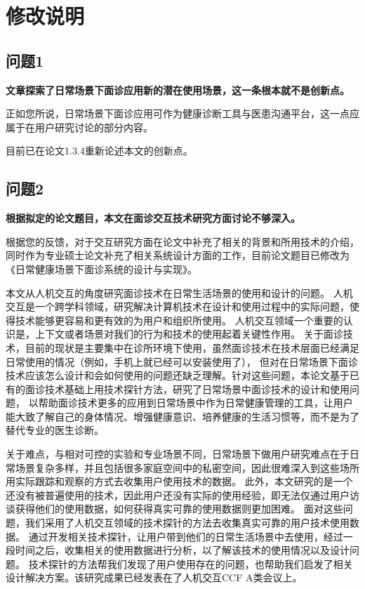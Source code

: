 
\chapter{修改说明}

\section{问题1}
\textbf{文章探索了日常场景下面诊应用新的潜在使用场景，这一条根本就不是创新点。}

正如您所说，日常场景下面诊应用可作为健康诊断工具与医患沟通平台，这一点应属于在用户研究讨论的部分内容。

目前已在论文1.3.4重新论述本文的创新点。

\section{问题2}
\textbf{根据拟定的论文题目，本文在面诊交互技术研究方面讨论不够深入。}

根据您的反馈，对于交互研究方面在论文中补充了相关的背景和所用技术的介绍，同时作为专业硕士论文补充了相关系统设计方面的工作，目前论文题目已修改为《日常健康场景下面诊系统的设计与实现》。

本文从人机交互的角度研究面诊技术在日常生活场景的使用和设计的问题。
人机交互是一个跨学科领域，研究解决计算机技术在设计和使用过程中的实际问题，使得技术能够更容易和更有效的为用户和组织所使用。
人机交互领域一个重要的认识是，上下文或者场景对我们的行为和技术的使用起着关键性作用\cite{1987Plans}。
关于面诊技术，目前的现状是主要集中在诊所环境下使用，虽然面诊技术在技术层面已经满足日常使用的情况（例如，手机上就已经可以安装使用了），
但对在日常场景下面诊技术应该怎么设计和会如何使用的问题还缺乏理解。针对这些问题，本论文基于已有的面诊技术基础上用技术探针方法，研究了日常场景中面诊技术的设计和使用问题，
以帮助面诊技术更多的应用到日常场景中作为日常健康管理的工具，让用户能大致了解自己的身体情况、增强健康意识、培养健康的生活习惯等，而不是为了替代专业的医生诊断。

关于难点，与相对可控的实验和专业场景不同，日常场景下做用户研究难点在于日常场景复杂多样，并且包括很多家庭空间中的私密空间，因此很难深入到这些场所用实际跟踪和观察的方式去收集用户使用技术的数据。
此外，本文研究的是一个还没有被普遍使用的技术，因此用户还没有实际的使用经验，即无法仅通过用户访谈获得他们的使用数据，如何获得真实可靠的使用数据则更加困难。
面对这些问题，我们采用了人机交互领域的技术探针的方法去收集真实可靠的用户技术使用数据。
通过开发相关技术探针，让用户带到他们的日常生活场景中去使用，经过一段时间之后，收集相关的使用数据进行分析，以了解该技术的使用情况以及设计问题。
技术探针的方法帮我们发现了用户使用存在的问题，也帮助我们启发了相关设计解决方案。该研究成果已经发表在了人机交互CCF A类会议上。

